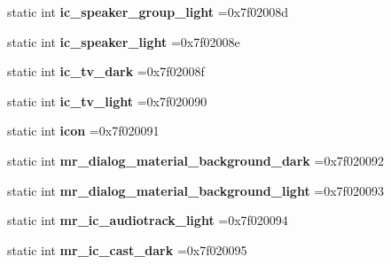 \begin{DoxyCompactItemize}
static int {\bfseries ic\+\_\+speaker\+\_\+group\+\_\+light} =0x7f02008d
\item 
\mbox{\label{classandroid_1_1support_1_1v4_1_1R_1_1drawable_a70c004280423b9411e0072a96bf93783}} 
static int {\bfseries ic\+\_\+speaker\+\_\+light} =0x7f02008e
\item 
\mbox{\label{classandroid_1_1support_1_1v4_1_1R_1_1drawable_a9da1613ea36d00a28fc80a697178a8a1}} 
static int {\bfseries ic\+\_\+tv\+\_\+dark} =0x7f02008f
\item 
\mbox{\label{classandroid_1_1support_1_1v4_1_1R_1_1drawable_aa5a87cd7fdbf86614fcd837508dcf4b9}} 
static int {\bfseries ic\+\_\+tv\+\_\+light} =0x7f020090
\item 
\mbox{\label{classandroid_1_1support_1_1v4_1_1R_1_1drawable_a3632dce3631d6cd3b1c03b9204db00f3}} 
static int {\bfseries icon} =0x7f020091
\item 
\mbox{\label{classandroid_1_1support_1_1v4_1_1R_1_1drawable_ad27a7c6652fa7b9bfbe9041e591a3f7d}} 
static int {\bfseries mr\+\_\+dialog\+\_\+material\+\_\+background\+\_\+dark} =0x7f020092
\item 
\mbox{\label{classandroid_1_1support_1_1v4_1_1R_1_1drawable_a6b02f8b260f98dad7aafd41708ac59ec}} 
static int {\bfseries mr\+\_\+dialog\+\_\+material\+\_\+background\+\_\+light} =0x7f020093
\item 
\mbox{\label{classandroid_1_1support_1_1v4_1_1R_1_1drawable_a6e4b4aa79a6042fda41ea6106a2ee38f}} 
static int {\bfseries mr\+\_\+ic\+\_\+audiotrack\+\_\+light} =0x7f020094
\item 
\mbox{\label{classandroid_1_1support_1_1v4_1_1R_1_1drawable_af5998ee203e5e12760ce0eec1c3fd633}} 
static int {\bfseries mr\+\_\+ic\+\_\+cast\+\_\+dark} =0x7f020095
\item 
\mbox{\label{classandroid_1_1support_1_1v4_1_1R_1_1drawable_adb83650981fffa0394917c3b0abee9d7}} 

\end{DoxyCompactItemize}
